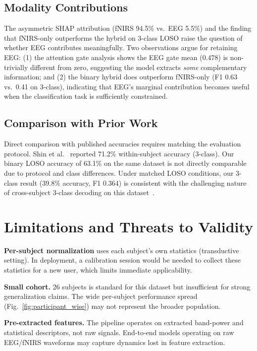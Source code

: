 \documentclass[conference]{IEEEtran}
\begin{document}
\subsection{Modality Contributions}

The asymmetric SHAP attribution (fNIRS 94.5\% vs.\ EEG 5.5\%) and the finding that fNIRS-only outperforms the hybrid on 3-class LOSO raise the question of whether EEG contributes meaningfully. Two observations argue for retaining EEG: (1) the attention gate analysis shows the EEG gate mean (0.478) is non-trivially different from zero, suggesting the model extracts \emph{some} complementary information; and (2) the binary hybrid does outperform fNIRS-only (F1 0.63 vs.\ 0.41 on 3-class), indicating that EEG's marginal contribution becomes useful when the classification task is sufficiently constrained.

\subsection{Comparison with Prior Work}

Direct comparison with published accuracies requires matching the evaluation protocol. Shin et al.~\cite{shin2018simultaneous} reported 71.2\% within-subject accuracy (3-class). Our binary LOSO accuracy of 63.1\% on the same dataset is not directly comparable due to protocol and class differences. Under matched LOSO conditions, our 3-class result (39.8\% accuracy, F1 0.364) is consistent with the challenging nature of cross-subject 3-class decoding on this dataset~\cite{khan2020hybrid}.


\section{Limitations and Threats to Validity}

\textbf{Per-subject normalization} uses each subject's own statistics (transductive setting). In deployment, a calibration session would be needed to collect these statistics for a new user, which limits immediate applicability.

\textbf{Small cohort.} 26 subjects is standard for this dataset but insufficient for strong generalization claims. The wide per-subject performance spread (Fig.~\ref{fig:participant_wise}) may not represent the broader population.

\textbf{Pre-extracted features.} The pipeline operates on extracted band-power and statistical descriptors, not raw signals. End-to-end models operating on raw EEG/fNIRS waveforms may capture dynamics lost in feature extraction.
\end{document}
